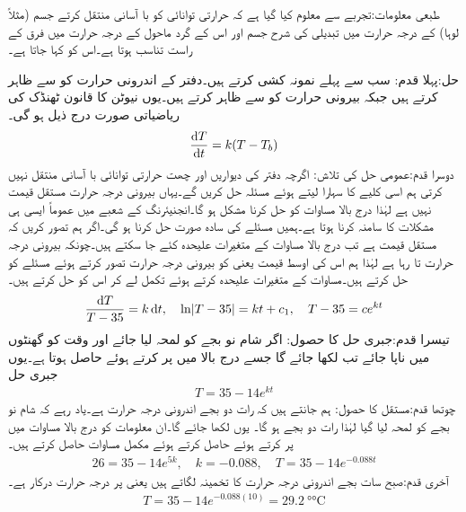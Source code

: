 طبعی معلومات:تجربے سے معلوم کیا گیا ہے کہ حرارتی توانائی کو با آسانی منتقل کرتے جسم (مثلاً لوہا) کے درجہ حرارت میں تبدیلی کی شرح جسم اور اس کے گرد ماحول کے درجہ حرارت میں فرق کے راست تناسب  ہوتا ہے۔اس کو  کہا جاتا ہے۔

حل:پہلا قدم: سب سے پہلے نمونہ کشی کرتے ہیں۔دفتر کے اندرونی حرارت کو  سے ظاہر کرتے ہیں جبکہ بیرونی حرارت کو  سے ظاہر کرتے ہیں۔یوں نیوٹن کا قانون ٹھنڈک کی ریاضیاتی صورت درج ذیل ہو گی۔
\begin{align}
\frac{\dif T}{\dif t}=k(T-T_b)
\end{align}
دوسرا قدم:عمومی حل کی تلاش:
اگرچہ دفتر کی دیواریں اور چھت حرارتی توانائی با آسانی منتقل نہیں کرتی ہم اسی کلیے کا سہارا لیتے ہوئے مسئلہ حل کریں گے۔یہاں بیرونی درجہ حرارت مستقل قیمت نہیں ہے لہٰذا درج بالا مساوات کو حل کرنا مشکل ہو گا۔انجنیئرنگ کے شعبے میں عموماً ایسی ہی مشکلات کا سامنہ کرنا ہوتا ہے۔ہمیں مسئلے کی سادہ صورت حل کرنا ہو گی۔اگر ہم تصور کریں کہ  مستقل قیمت ہے تب درج بالا مساوات کے متغیرات علیحدہ کئے جا سکتے ہیں۔چونکہ بیرونی درجہ حرارت  تا  رہا ہے لہٰذا ہم اس کی اوسط قیمت یعنی  کو بیرونی درجہ حرارت تصور کرتے ہوئے مسئلے کو حل کرتے ہیں۔مساوات کے متغیرات علیحدہ کرتے ہوئے تکمل لے کر اس کو حل کرتے ہیں۔
\begin{align*}
\frac{\dif T}{T-35}=k\dif t, \quad \ln\abs{T-35}=kt+c_1,\quad T-35=ce^{kt}
\end{align*}
تیسرا قدم:جبری حل کا حصول:
اگر شام نو بجے کو لمحہ  لیا جائے اور وقت کو گھنٹوں میں ناپا جائے تب  لکھا جائے گا جسے درج بالا میں پر کرتے ہوئے  حاصل ہوتا ہے۔یوں جبری حل
\begin{align*}
T=35-14e^{kt}
\end{align*}
چوتھا قدم:مستقل  کا حصول:
ہم جانتے ہیں کہ رات دو بجے  اندرونی درجہ حرارت   ہے۔یاد رہے کہ شام نو بجے کو لمحہ  لیا گیا لہٰذا رات دو بجے  ہو گا۔
یوں  لکھا جائے گا۔ان معلومات کو درج بالا مساوات میں پر کرتے ہوئے  حاصل کرتے ہوئے مکمل مساوات حاصل کرتے ہیں۔
\begin{align*}
26=35-14e^{5k},\quad k=-0.088, \quad T=35-14e^{-0.088t}
\end{align*}
آخری قدم:صبح سات بجے اندرونی درجہ حرارت کا تخمینہ لگاتے ہیں یعنی  پر درجہ حرارت درکار ہے۔
\begin{align*}
T=35-14e^{-0.088(10)}=\SI{29.2}{\degree\celsius}
\end{align*} 
